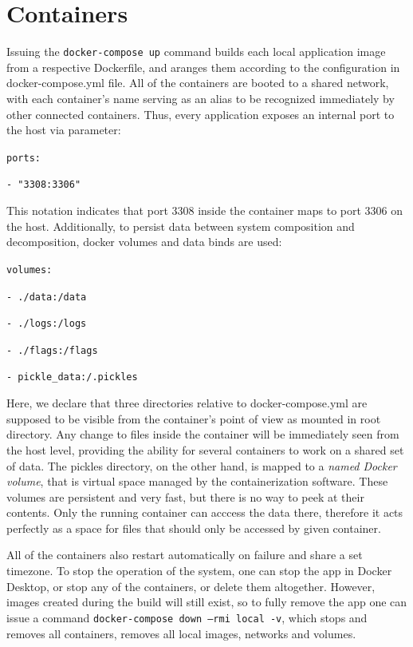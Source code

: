 \section{Containers}
Issuing the \texttt{docker-compose up} command builds each local application image from a respective Dockerfile, and aranges them according to the configuration in docker-compose.yml file. All of the containers are booted to a shared network, with each container's name serving as an alias to be recognized immediately by other connected containers. Thus, every application exposes an internal port to the host via parameter: \par
\texttt{ports:} \par
\texttt{\qquad - "3308:3306"} \par
This notation indicates that port 3308 inside the container maps to port 3306 on the host. Additionally, to persist data between system composition and decomposition, docker volumes and data binds are used: \par
\texttt{volumes:} \par
\texttt{\qquad - ./data:/data} \par
\texttt{\qquad - ./logs:/logs} \par
\texttt{\qquad - ./flags:/flags} \par
\texttt{\qquad - pickle\_data:/.pickles} \par

Here, we declare that three directories relative to docker-compose.yml are supposed to be visible from the container's point of view as mounted in root directory. Any change to files inside the container will be immediately seen from the host level, providing the ability for several containers to work on a shared set of data. The pickles directory, on the other hand, is mapped to a \textit{named Docker volume}, that is virtual space managed by the containerization software. These volumes are persistent and very fast, but there is no way to peek at their contents. Only the running container can acccess the data there, therefore it acts perfectly as a space for files that should only be accessed by given container. \par
All of the containers also restart automatically on failure and share a set timezone. To stop the operation of the system, one can stop the app in Docker Desktop, or stop any of the containers, or delete them altogether. However, images created during the build will still exist, so to fully remove the app one can issue a command \texttt{docker-compose down --rmi local -v}, which stops and removes all containers, removes all local images, networks and volumes.

